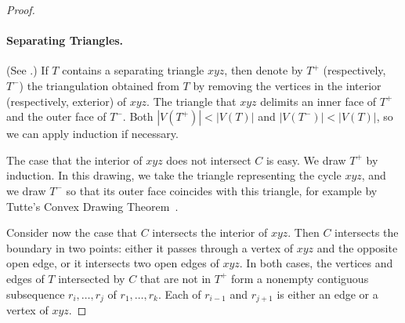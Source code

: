 \begin{proof}
	
	
\paragraph{Separating Triangles.}
(See .)
	If $T$ contains a separating triangle $xyz$, then denote by
        $T^+$ (respectively, $T^-$) the triangulation obtained from
        $T$ by removing the vertices in the interior
        (respectively, exterior) of $xyz$. The triangle that $xyz$ delimits an
        inner face of $T^+$ and the outer face of $T^-$.
Both $|V(T^+)|<|V(T)|$
and $|V(T^-)|<|V(T)|$, so we can apply induction if necessary.
        
The case that the interior of $xyz$ does not intersect $C$ is easy.
We draw $T^+$ by induction.  In this drawing, %
we take the triangle representing the cycle $xyz$, and we draw $T^-$
so that its outer face coincides with this triangle, for example by
Tutte's Convex Drawing Theorem~\cite{tutte:how}.

Consider now the case that $C$ intersects the interior of $xyz$. Then
$C$ intersects the boundary in two points: either it passes through a
vertex of $xyz$ and the opposite open edge, or it intersects two open
edges of $xyz$. %
In both cases, the vertices and edges of $T$ intersected by $C$ that
are not in $T^+$ form a nonempty contiguous subsequence
$r_i,\ldots,r_j$ of $r_1,\ldots,r_k$. Each of $r_{i-1}$ and $r_{j+1}$
is either an edge or a vertex of $xyz$.
	

\end{proof}
